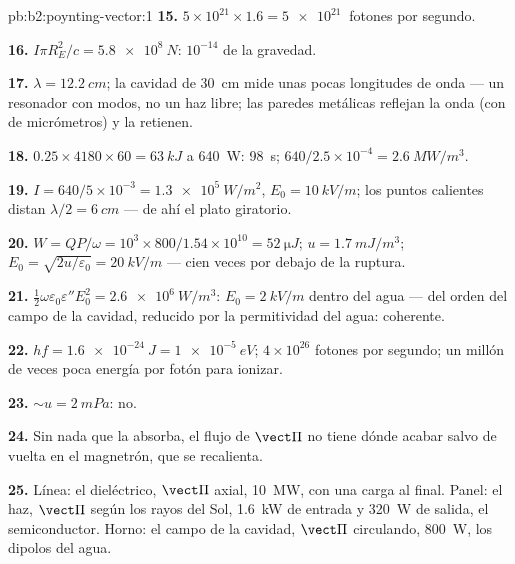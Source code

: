 \begin{solution}{pb:b2:poynting-vector:1}
\textbf{15.} $5 \times 10^{21} \times 1.6 = \qty{5e21}{}$ fotones por segundo.

\textbf{16.} $I\pi R_E^2/c = \qty{5.8e8}{N}$: $10^{-14}$ de la gravedad.

\textbf{17.} $\lambda = \qty{12.2}{cm}$; la cavidad de \qty{30}{cm} mide unas
pocas longitudes de onda --- un resonador con modos, no un haz libre; las
paredes metálicas reflejan la onda (con  de
micrómetros) y la retienen.

\textbf{18.} $0.25 \times 4180 \times 60 = \qty{63}{kJ}$ a \qty{640}{W}: \qty{98}{s};
$640/2.5 \times 10^{-4} = \qty{2.6}{MW/m^3}$.

\textbf{19.} $I = 640/5 \times 10^{-3} = \qty{1.3e5}{W/m^2}$, $E_0 = \qty{10}{kV/m}$; los puntos calientes
distan $\lambda/2 = \qty{6}{cm}$ --- de ahí el plato giratorio.

\textbf{20.} $W = QP/\omega = 10^3 \times 800/1.54 \times 10^{10} = \qty{52}{\micro J}$; $u =
\qty{1.7}{mJ/m^3}$; $E_0 = \sqrt{2u/\varepsilon_0} = \qty{20}{kV/m}$ --- cien veces por debajo
de la ruptura.

\textbf{21.} $\tfrac12\omega\varepsilon_0\varepsilon''E_0^2 = \qty{2.6e6}{W/m^3}$: $E_0 = \qty{2}{kV/m}$
dentro del agua --- del orden del campo de la cavidad, reducido por la
permitividad del agua: coherente.

\textbf{22.} $hf = \qty{1.6e-24}{J} = \qty{1e-5}{eV}$; $4 \times 10^{26}$ fotones por segundo;
un millón de veces poca energía por fotón para ionizar.

\textbf{23.} $\sim u = \qty{2}{mPa}$: no.

\textbf{24.} Sin nada que la absorba, el flujo de $\vect\Pi$ no tiene dónde
acabar salvo de vuelta en el magnetrón, que se recalienta.

\textbf{25.} Línea: el dieléctrico, $\vect\Pi$ axial, \qty{10}{MW}, con una
carga al final. Panel: el haz, $\vect\Pi$ según los rayos del Sol,
\qty{1.6}{kW} de entrada y \qty{320}{W} de salida, el semiconductor. Horno:
el campo de la cavidad, $\vect\Pi$ circulando, \qty{800}{W}, los dipolos del agua.
\end{solution}
